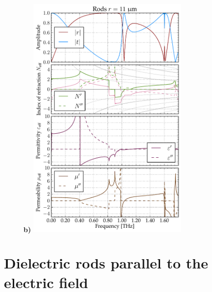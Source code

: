 {\begin{figure}[ht]
\textbf{b)}	\includegraphics[width=8.0cm]{img/old/ERods_eps100_11um_FDTD.pdf}
\end{figure}

}






\section{Dielectric rods parallel to the electric field} %

\label{sect_diel_rods_el}
\cite{yang2015}






